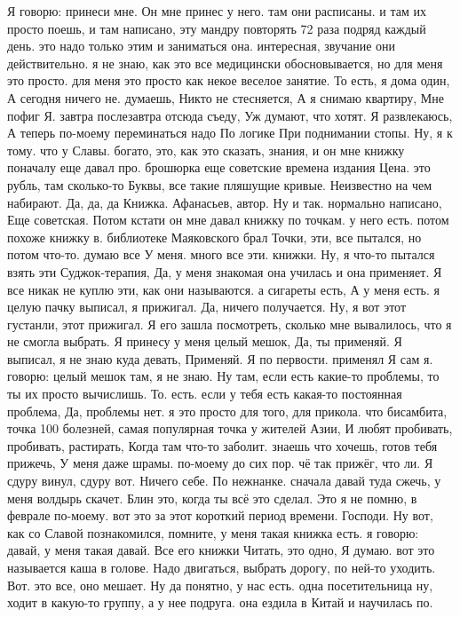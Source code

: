 Я говорю: принеси мне.
Он мне принес у него. там они расписаны.
и там их просто поешь, и там написано, эту мандру повторять 72 раза подряд каждый день. это надо только этим и заниматься она. интересная, звучание они действительно. я не знаю, как это все медицински обосновывается, но для меня это просто.
для меня это просто как некое веселое занятие. То есть, я дома один,
А сегодня ничего не.
думаешь, Никто не стесняется, А я снимаю квартиру, Мне пофиг Я.
завтра послезавтра отсюда съеду, Уж думают, что хотят. Я развлекаюсь, А теперь по-моему переминаться надо По логике При поднимании стопы. Ну, я к тому.
что у Славы.
богато, это, как это сказать, знания, и он мне книжку поначалу еще давал про.
брошюрка еще советские времена издания Цена.
это рубль, там сколько-то Буквы, все такие пляшущие кривые.
Неизвестно на чем набирают.
Да, да, да Книжка.
Афанасьев, автор. Ну и так.
нормально написано, Еще советская. Потом кстати он мне давал книжку по точкам. у него есть.
потом похоже книжку в.
библиотеке Маяковского брал Точки, эти, все пытался, но потом что-то.
думаю все У меня.
много все эти.
книжки. Ну, я что-то пытался взять эти Суджок-терапия, Да, у меня знакомая она училась и она применяет. Я все никак не куплю эти, как они называются.
а сигареты есть, А у меня есть. я целую пачку выписал, я прижигал.
Да, ничего получается. Ну, я вот этот густанли, этот прижигал. Я его зашла посмотреть, сколько мне вывалилось, что я не смогла выбрать. Я принесу у меня целый мешок, Да, ты применяй. Я выписал, я не знаю куда девать, Применяй.
Я по первости.
применял Я сам я.
говорю: целый мешок там, я не знаю.
Ну там, если есть какие-то проблемы, то ты их просто вычислишь. То.
есть. если у тебя есть какая-то постоянная проблема, Да, проблемы нет. я это просто для того, для прикола.
что бисамбита, точка 100 болезней, самая популярная точка у жителей Азии, И любят пробивать, пробивать, растирать, Когда там что-то заболит. знаешь что хочешь, готов тебя прижечь, У меня даже шрамы.
по-моему до сих пор.
чё так прижёг, что ли.
Я сдуру винул, сдуру вот.
Ничего себе.
По нежнанке. сначала давай туда сжечь, у меня волдырь скачет.
Блин это, когда ты всё это сделал.
Это я не помню, в феврале по-моему.
вот это за этот короткий период времени.
Господи.
Ну вот, как со Славой познакомился, помните, у меня такая книжка есть. я говорю: давай, у меня такая давай.
Все его книжки Читать, это одно, Я думаю. вот это называется каша в голове. Надо двигаться, выбрать дорогу, по ней-то уходить. Вот.
это все, оно мешает. Ну да понятно, у нас есть.
одна посетительница ну, ходит в какую-то группу, а у нее подруга. она ездила в Китай и научилась по.
